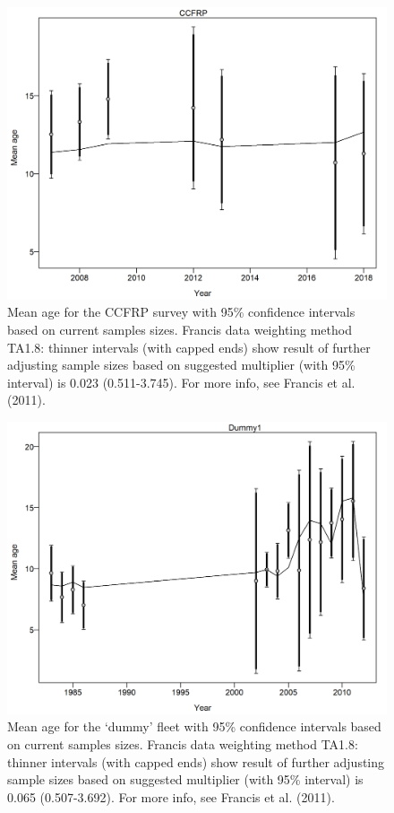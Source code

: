 \documentclass[12pt,]{article}
\begin{document}
\begin{figure}
\centering
\includegraphics{r4ss/plots_mod1/comp_condAALfit_data_weighting_TA1.8_condAgeCCFRP.png}
\caption{Mean age for the CCFRP survey with 95\% confidence intervals
based on current samples sizes. Francis data weighting method TA1.8:
thinner intervals (with capped ends) show result of further adjusting
sample sizes based on suggested multiplier (with 95\% interval) is 0.023
(0.511-3.745). For more info, see Francis et al. (2011).
\label{fig:comp_condAALfit_data_weighting_TA1.8_condAgeCCFRP}}
\end{figure}

\begin{figure}
\centering
\includegraphics{r4ss/plots_mod1/comp_condAALfit_data_weighting_TA1.8_condAgeDummy1.png}
\caption{Mean age for the `dummy' fleet with 95\% confidence intervals
based on current samples sizes. Francis data weighting method TA1.8:
thinner intervals (with capped ends) show result of further adjusting
sample sizes based on suggested multiplier (with 95\% interval) is 0.065
(0.507-3.692). For more info, see Francis et al. (2011).
\label{fig:comp_condAALfit_data_weighting_TA1.8_condAgeDummy1}}
\end{figure}
\end{document}
